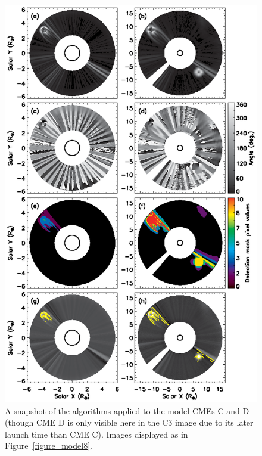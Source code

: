 \documentclass[preprint2]{aastex}
\begin{document}
\begin{figure}[!t]
\centerline{\includegraphics[scale=0.78, clip=true, trim=0 0 0 0]{images/figure_model8_2.eps}}
\caption{A snapshot of the algorithms applied to the model CMEs C and D (though CME D is only visible here in the C3 image due to its later launch time than CME C). Images displayed as in Figure~\ref{figure_model8}.}
\label{figure_model8_2}
\end{figure}
\end{document}
